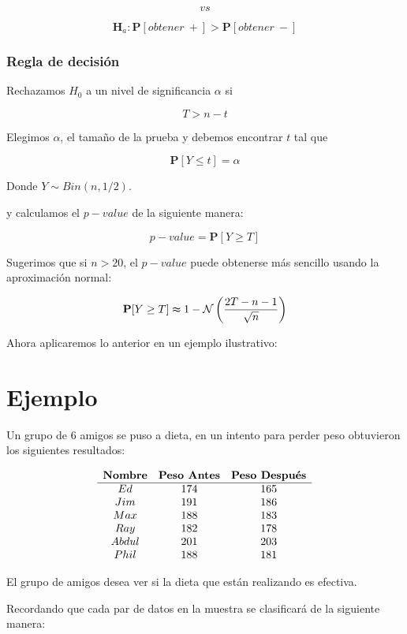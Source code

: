 \documentclass[
  a4paper,
  oneside,
  openany]{book}
\begin{document}
\[vs\]

\[\textbf{H}_a: \mathbf{P}[obtener\ +] > \mathbf{P}[obtener\ -]\]

\hypertarget{regla-de-decisiuxf3n-8}{%
\subsubsection*{Regla de decisión}\label{regla-de-decisiuxf3n-8}}


Rechazamos \(H_0\) a un nivel de significancia \(\alpha\) si

\[T > n-t\]

Elegimos \(\alpha\), el tamaño de la prueba y debemos encontrar \(t\) tal que

\[\mathbf{P}[Y \leq t]=\alpha\]

Donde \(Y \sim Bin (n,1/2)\).

y calculamos el \(p-value\) de la siguiente manera:

\[p-value=\mathbf{P}[Y\geq T]\]

Sugerimos que si \(n > 20\), el \(p-value\) puede obtenerse más sencillo usando la aproximación normal:

\[\mathbf{P}[Y\geq T] \thickapprox 1- \mathcal{N} \left(\frac{2T-n-1}{\sqrt{n}}\right)\]

Ahora aplicaremos lo anterior en un ejemplo ilustrativo:

\hypertarget{ejemplo-2}{%
\section{Ejemplo}\label{ejemplo-2}}

Un grupo de 6 amigos se puso a dieta, en un intento para perder peso obtuvieron los siguientes resultados:

\[
\begin{array}{c c c c } 
\textbf{Nombre} & \textbf{Peso Antes} & \textbf{Peso Después} \\
\hline
Ed    & 174 & 165 \\
Jim   & 191 & 186 \\
Max   & 188 & 183 \\
Ray   & 182 & 178 \\
Abdul & 201 & 203 \\
Phil  & 188 & 181 \\
\end{array} 
\]

El grupo de amigos desea ver si la dieta que están realizando es efectiva.

Recordando que cada par de datos en la muestra se clasificará de la siguiente manera:
\end{document}
